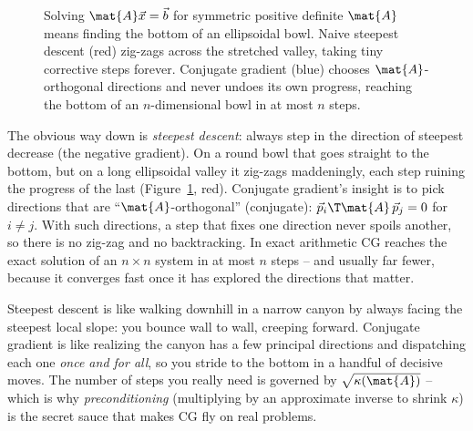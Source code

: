 \begin{figure}[H]
\centering
{}
\caption{Solving $\mat{A}\vec{x}=\vec{b}$ for symmetric positive definite $\mat{A}$
means finding the bottom of an ellipsoidal bowl. Naive steepest descent (red)
zig-zags across the stretched valley, taking tiny corrective steps forever. Conjugate
gradient (blue) chooses $\mat{A}$-orthogonal directions and never undoes its own
progress, reaching the bottom of an $n$-dimensional bowl in at most $n$ steps.}
\label{ch33:cg}
\end{figure}

The obvious way down is \emph{steepest descent}: always step in the direction of
steepest decrease (the negative gradient). On a round bowl that goes straight to the
bottom, but on a long ellipsoidal valley it zig-zags maddeningly, each step ruining the
progress of the last (Figure~\ref{ch33:cg}, red). Conjugate gradient's insight is to
pick directions that are ``$\mat{A}$-orthogonal'' (conjugate): $\vec{p}_i\T\mat{A}\,
\vec{p}_j=0$ for $i\ne j$. With such directions, a step that fixes one direction never
spoils another, so there is no zig-zag and no backtracking. In exact arithmetic CG
reaches the exact solution of an $n\times n$ system in at most $n$ steps -- and usually
far fewer, because it converges fast once it has explored the directions that matter.

\begin{intuitionbox}
Steepest descent is like walking downhill in a narrow canyon by always facing the
steepest local slope: you bounce wall to wall, creeping forward. Conjugate gradient is
like realizing the canyon has a few principal directions and dispatching each one
\emph{once and for all}, so you stride to the bottom in a handful of decisive moves.
The number of steps you really need is governed by $\sqrt{\kappa(\mat{A})}$ -- which is
why \emph{preconditioning} (multiplying by an approximate inverse to shrink $\kappa$)
is the secret sauce that makes CG fly on real problems.
\end{intuitionbox}

